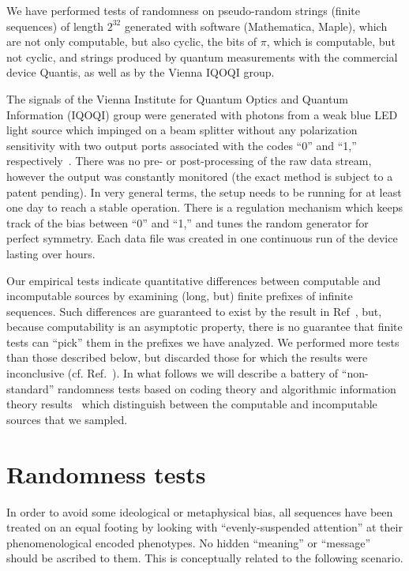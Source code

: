 \documentclass[10pt]{article}%
\begin{document}
We have performed
tests of randomness on pseudo-random strings (finite sequences) of length $2^{32}$ generated with software
(Mathematica, Maple),  which are not only computable, but also cyclic, the bits of $\pi$, which is computable, but not cyclic, and strings produced by quantum measurements with the commercial device Quantis, as well as  by the Vienna IQOQI group.



The signals of the Vienna Institute for Quantum Optics and Quantum
Information (IQOQI)
group were generated with photons from a weak blue LED light source which impinged on a
beam splitter
without any polarization sensitivity with two output ports associated
with the codes ``0'' and ``1,'' respectively~\cite{zeilinger:qct}.
There was no pre- or post-processing of the raw data stream,
however the output was constantly monitored
(the exact method is subject to a patent pending).
In very general terms, the setup needs to be running for at least one
day to reach a stable operation.
There is a regulation mechanism which keeps track of the bias between
``0'' and ``1,''
and  tunes the random generator for perfect symmetry.
Each data file was created in one continuous run of the device
lasting over hours.





Our empirical tests indicate quantitative differences between computable
and incomputable sources by examining (long, but)
finite prefixes of infinite sequences.
Such differences are guaranteed to exist by the result in Ref~\cite{2008-cal-svo}, but, because computability is an asymptotic property,
there is no guarantee that
finite tests can ``pick'' them  in the prefixes we have analyzed.
We performed more tests than those described below, but discarded
those for which the results were inconclusive  (cf. Ref.~\cite{Rukhin-nist}).
In what follows we will describe
a battery of ``non-standard'' randomness tests based on coding theory and
algorithmic information theory results~\cite{calude:02}  which distinguish
between the  computable
and incomputable sources that we sampled.



\section{Randomness tests}

\label{tests}
In order to avoid some ideological or metaphysical bias, all
sequences have been treated on an equal footing by looking with
``evenly-suspended attention'' at their phenomenological encoded
phenotypes. No hidden ``meaning'' or ``message'' should be ascribed to them.
This is conceptually related to the following scenario.
\end{document}
